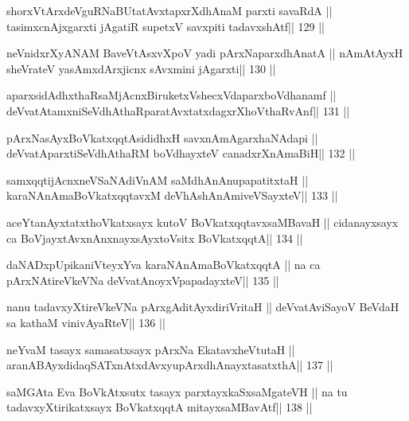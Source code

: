 \begin{shl}
shorxVtArxdeVguRNaBUtatAvxtapxrXdhAnaM parxti savaRdA ||
tasimxcnAjxgarxti jAgatiR supetxV savxpiti tadavxshAtf\hfill || 129 ||
\end{shl}

\begin{shl}
neVnidxrXyANAM BaveVtAsxvXpoV yadi pArxNaparxdhAnatA ||
nAmAtAyxH sheVrateV yasAmxdArxjicnx sAvxmini jAgarxti\hfill || 130 ||
\end{shl}

\begin{shl}
aparxsidAdhxthaRsaMjAcnxBiruketxVshecxVdaparxboVdhanamf ||
deVvatAtamxniSeVdhAthaRparatAvxtatxdagxrXhoV\s thaRvAnf\hfill || 131 ||
\end{shl}

\begin{shl}
pArxNasAyxBoVkatxqqtAsididhxH savxnAmAgarxhaNAdapi ||
deVvatAparxtiSeVdhAthaRM boVdhayxteV  canadxrXnAmaBiH\hfill || 132 ||
\end{shl}

\begin{shl}
samxqqtijAcnxneVSaNAdiVnAM saMdhAnAnupapatitxtaH ||
karaNAnAmaBoVkatxqqtavxM deVhAshAnAmiveVSayxteV\hfill || 133 ||
\end{shl}

\begin{shl}
aceYtanAyxtatxthoVkatxsayx kutoV BoVkatxqqtavxsaMBavaH ||
cidanayxsayx ca BoVjayxtAvxnAnxnayxsAyxtoV\s sitx BoVkatxqqtA\hfill || 134 ||
\end{shl}

\begin{shl}
daNADxpUpikaniVteyxYva karaNAnAmaBoVkatxqqtA ||
na ca pArxNAtireVkeVNa deVvatA\s noyxVpapadayxteV\hfill || 135 ||
\end{shl}

\begin{shl}
nanu tadavxyXtireVkeVNa pArxgAditAyxdiriVritaH ||
deVvatAviSayoV BeVdaH sa kathaM vinivAyaRteV\hfill || 136 ||
\end{shl}

\begin{shl}
neYvaM tasayx samasatxsayx pArxNa EkatavxheVtutaH ||
aranABAyxdidaqSATxnAtxdAvxyupArxdhAnayxtasatxthA\hfill || 137 ||
\end{shl}

\begin{shl}
saMGAta Eva BoVkAtx\s sutx tasayx parxtayxkaSxsaMgateVH ||
na tu tadavxyXtirikatxsayx BoVkatxqqtA mitayxsaMBavAtf\hfill || 138 ||
\end{shl}

